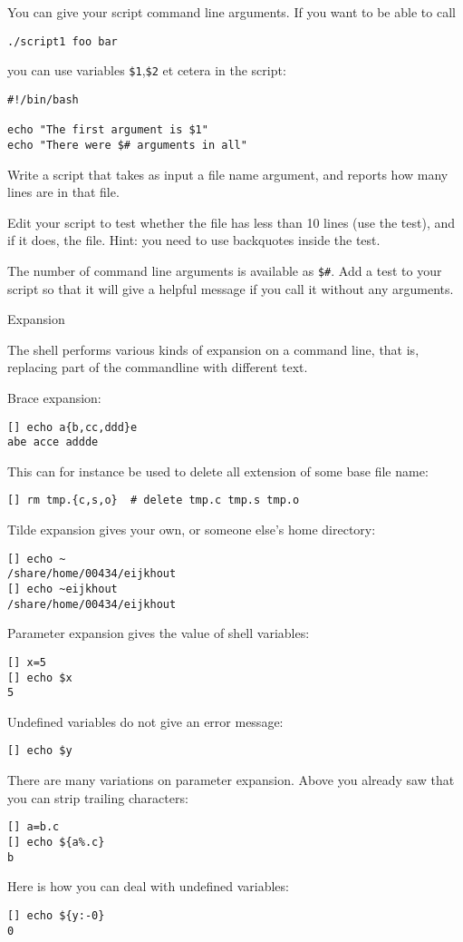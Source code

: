 You can give your script command line arguments. If you want to be
able to call
\begin{verbatim}
./script1 foo bar
\end{verbatim}
you can use variables \verb+$1+,\verb+$2+ et cetera in the script:
\begin{verbatim}
#!/bin/bash

echo "The first argument is $1"
echo "There were $# arguments in all"
\end{verbatim}

Write a script that takes as input a file name argument, and reports how many
lines are in that file.

Edit your script to test whether the file has less than 10 lines
(use the  test), and if it does,  the
file. Hint: you need to use backquotes inside the test.

The number of command line arguments is available as \verb+$#+. Add a
test to your script so that it will give a helpful message if you call
it without any arguments.

 {Expansion}
\label{tut:unix-expansion}

The shell performs various kinds of expansion on a command line, that
is, replacing part of the commandline with different text.

Brace expansion:
\begin{verbatim}
[] echo a{b,cc,ddd}e
abe acce addde
\end{verbatim}
This can for instance be used to delete all extension of some base
file name:
\begin{verbatim}
[] rm tmp.{c,s,o}  # delete tmp.c tmp.s tmp.o
\end{verbatim}

Tilde expansion gives your own, or someone else's home directory:
\begin{verbatim}
[] echo ~
/share/home/00434/eijkhout
[] echo ~eijkhout
/share/home/00434/eijkhout
\end{verbatim}

Parameter expansion gives the value of shell variables:
\begin{verbatim}
[] x=5
[] echo $x
5
\end{verbatim}
Undefined variables do not give an error message:
\begin{verbatim}
[] echo $y
\end{verbatim}
There are many variations on parameter expansion. Above you already
saw that you can strip trailing characters:
\begin{verbatim}
[] a=b.c
[] echo ${a%.c}
b
\end{verbatim}
Here is how you can deal with undefined variables:
\begin{verbatim}
[] echo ${y:-0}
0
\end{verbatim}

